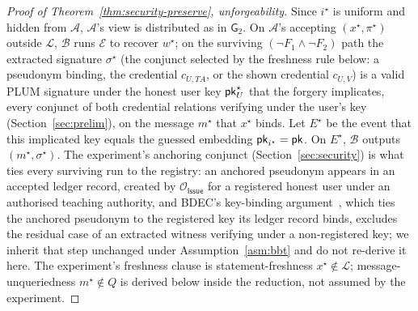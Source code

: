\begin{proof}[Proof of Theorem~\ref{thm:security-preserve}, unforgeability]
Since $i^\star$ is uniform and hidden from $\mathcal A$, $\mathcal A$'s view is distributed as in $\mathsf G_2$. On $\mathcal A$'s accepting $(x^\star,\pi^\star)$ outside $\mathcal L$, $\mathcal B$ runs $\mathcal E$ to recover $w^\star$; on the surviving $(\neg F_1\wedge\neg F_2)$ path the extracted signature $\sigma^\star$ (the conjunct selected by the freshness rule below: a pseudonym binding, the credential $c_{U,TA}$, or the shown credential $c_{U,V}$) is a valid PLUM signature under the honest user key $\mathsf{pk}_U^\star$ that the forgery implicates, every conjunct of both credential relations verifying under the user's key (Section~\ref{sec:prelim}), on the message $m^\star$ that $x^\star$ binds. Let $E^\star$ be the event that this implicated key equals the guessed embedding $\mathsf{pk}_{i^\star}=\mathsf{pk}$. On $E^\star$, $\mathcal B$ outputs $(m^\star,\sigma^\star)$. The experiment's anchoring conjunct (Section~\ref{sec:security}) is what ties every surviving run to the registry: an anchored pseudonym appears in an accepted ledger record, created by $\mathcal O_{\mathsf{Issue}}$ for a registered honest user under an authorised teaching authority, and BDEC's key-binding argument~\cite[Appendix~A.1]{10.1007/978-981-96-0957-4_3}, which ties the anchored pseudonym to the registered key its ledger record binds, excludes the residual case of an extracted witness verifying under a non-registered key; we inherit that step unchanged under Assumption~\ref{asm:bbt} and do not re-derive it here. The experiment's freshness clause is statement-freshness $x^\star\notin\mathcal L$; message-unqueriedness $m^\star\notin Q$ is derived below inside the reduction, not assumed by the experiment.


\end{proof}
